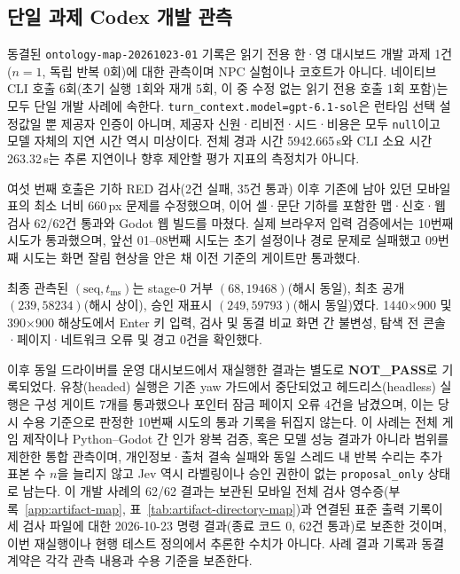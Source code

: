 \documentclass[journal]{IEEEtran}
\begin{document}
\subsection{단일 과제 Codex 개발 관측}\label{sec:development-case}
동결된 \texttt{ontology-map-20261023-01} 기록은 읽기 전용 한·영 대시보드 개발 과제 1건($n{=}1$, 독립 반복 $0$회)에 대한 관측이며 NPC 실험이나 코호트가 아니다. 네이티브 CLI 호출 6회(초기 실행 1회와 재개 5회, 이 중 수정 없는 읽기 전용 호출 1회 포함)는 모두 단일 개발 사례에 속한다. \texttt{turn\_context.model=gpt-6.1-sol}은 런타임 선택 설정값일 뿐 제공자 인증이 아니며, 제공자 신원·리비전·시드·비용은 모두 \texttt{null}이고 모델 자체의 지연 시간 역시 미상이다. 전체 경과 시간 5942.665\,s와 CLI 소요 시간 263.32\,s는 추론 지연이나 향후 제안할 평가 지표의 측정치가 아니다.

여섯 번째 호출은 기하 RED 검사(2건 실패, 35건 통과) 이후 기존에 남아 있던 모바일 표의 최소 너비 660\,px 문제를 수정했으며, 이어 셀·문단 기하를 포함한 맵·신호·웹 검사 62/62건 통과와 Godot 웹 빌드를 마쳤다. 실제 브라우저 입력 검증에서는 10번째 시도가 통과했으며, 앞선 01--08번째 시도는 초기 설정이나 경로 문제로 실패했고 09번째 시도는 화면 잘림 현상을 안은 채 이전 기준의 게이트만 통과했다.

최종 관측된 $(\text{seq},t_{\mathrm{ms}})$는 stage-$0$ 거부 $(68,19468)$(해시 동일), 최초 공개 $(239,58234)$(해시 상이), 승인 재표시 $(249,59793)$(해시 동일)였다. 1440$\times$900 및 390$\times$900 해상도에서 Enter 키 입력, 검사 및 동결 비교 화면 간 불변성, 탐색 전 콘솔·페이지·네트워크 오류 및 경고 0건을 확인했다.

이후 동일 드라이버를 운영 대시보드에서 재실행한 결과는 별도로 \textbf{NOT\_PASS}로 기록되었다. 유창(headed) 실행은 기존 yaw 가드에서 중단되었고 헤드리스(headless) 실행은 구성 게이트 7개를 통과했으나 포인터 잠금 페이지 오류 4건을 남겼으며, 이는 당시 수용 기준으로 판정한 10번째 시도의 통과 기록을 뒤집지 않는다. 이 사례는 전체 게임 제작이나 Python--Godot 간 인가 왕복 검증, 혹은 모델 성능 결과가 아니라 범위를 제한한 통합 관측이며, 개인정보·출처 결속 실패와 동일 스레드 내 반복 수리는 추가 표본 수 $n$을 늘리지 않고 Jev 역시 라벨링이나 승인 권한이 없는 \texttt{proposal\_only} 상태로 남는다.
이 개발 사례의 62/62 결과는 보관된 모바일 전체 검사 영수증(부록~\ref{app:artifact-map}, 표~\ref{tab:artifact-directory-map})과 연결된 표준 출력 기록이 세 검사 파일에 대한 2026-10-23 명령 결과(종료 코드 0, 62건 통과)로 보존한 것이며, 이번 재실행이나 현행 테스트 정의에서 추론한 수치가 아니다. 사례 결과 기록과 동결 계약은 각각 관측 내용과 수용 기준을 보존한다.


\end{document}
